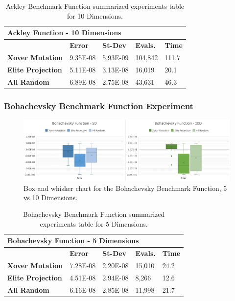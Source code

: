 \documentclass[graybox]{svmult}
\begin{document}
    \begin{table}[]
        \scriptsize
        \centering
        \caption{Ackley Benchmark Function summarized experiments table for 10 Dimensions.}\label{tab.fun_ackley10}
        \begin{tabular}{@{}lllll@{}}
        \toprule
        \multicolumn{5}{l}{\textbf{Ackley Function - 10 Dimensions}} \\ \midrule
        & \textbf{Error} & \textbf{St-Dev} & \textbf{Evals.} & \textbf{Time} \\
        \textbf{Xover Mutation} & 9.35E-08 & 5.93E-09 & 104,842 & 111.7 \\
        \textbf{Elite Projection} & 5.11E-08 & 3.13E-08 & 16,019 & 20.1 \\
        \textbf{All Random} & 6.89E-08 & 2.75E-08 & 43,631 & 46.3 \\ \bottomrule
        \end{tabular}
        \end{table}


\subsubsection{Bohachevsky Benchmark Function Experiment}

    \begin{figure}
        \includegraphics[width=\linewidth, frame]{img/fig_fun_bohachevsky.pdf}
        \caption{Box and whisker chart for the Bohachevsky Benchmark Function, 5 vs 10 Dimensions.} \label{fig.fun_bohachevsky}
        \end{figure}

    \begin{table}[]
        \scriptsize
        \centering
        \caption{Bohachevsky Benchmark Function summarized experiments table for 5 Dimensions.}\label{tab.fun_bohachevsky5}
        \begin{tabular}{@{}lllll@{}}
        \toprule
        \multicolumn{5}{l}{\textbf{Bohachevsky Function - 5 Dimensions}} \\ \midrule
        & \textbf{Error} & \textbf{St-Dev} & \textbf{Evals.} & \textbf{Time} \\
        \textbf{Xover Mutation} & 7.28E-08 & 2.20E-08 & 15,010 & 24.2 \\
        \textbf{Elite Projection} & 4.51E-08 & 2.94E-08 & 8,266 & 12.6 \\
        \textbf{All Random} & 6.16E-08 & 2.85E-08 & 11,998 & 21.7 \\ \bottomrule
        \end{tabular}
        \end{table}
\end{document}

